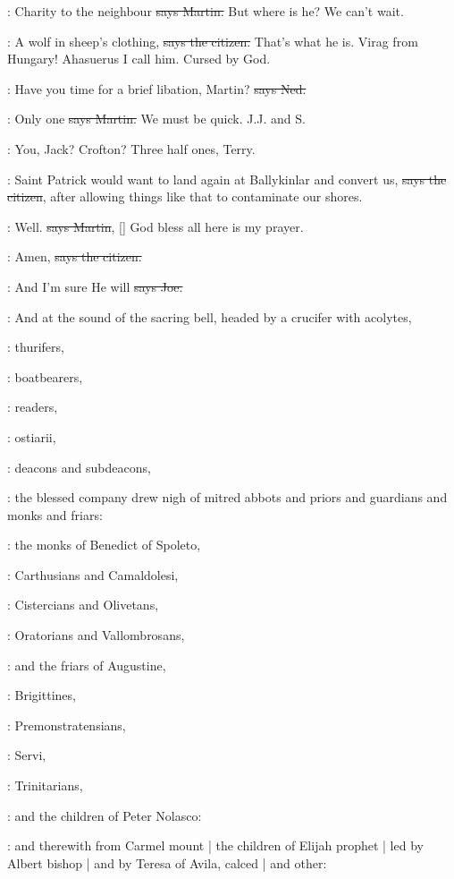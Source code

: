 \cunningham:
Charity to the neighbour
\sout{says Martin.}
But where is he?
We can't wait.

\citizen:
A wolf in sheep's clothing,
\sout{says the citizen.}
That's what he is.
Virag from Hungary!
Ahasuerus I call him.
Cursed by God.

\lambert:
Have you time for a brief libation,
Martin?
\sout{says Ned.}

\cunningham:
Only one
\sout{says Martin.}
We must be quick.
J.J. and S.

\lambert:
You,
Jack?
Crofton?
Three half ones,
Terry.

\citizen:
Saint Patrick would want to land again
at Ballykinlar and convert us,
\sout{says the citizen},
after allowing things like that to contaminate our shores.

\cunningham:
Well.
\sout{says Martin},
[]
God bless all here is my prayer.

\citizen:
Amen,
\sout{says the citizen.}

\joe:
And I'm sure He will
\sout{says Joe.}

:
And at the sound of the sacring bell,
headed by a crucifer with acolytes,

:
thurifers,

:
boatbearers,

:
readers,

:
ostiarii,

:
deacons and subdeacons,

:
the blessed company drew nigh
of mitred abbots
and priors
and guardians
and monks
and friars:

:
the monks of Benedict of Spoleto,

:
Carthusians and Camaldolesi,

:
Cistercians and Olivetans,

:
Oratorians and Vallombrosans,

:
and the friars of Augustine,

:
Brigittines,

:
Premonstratensians,

:
Servi,

:
Trinitarians,

:
and the children of Peter Nolasco:

:
and therewith from Carmel mount |
the children of Elijah prophet |
led by Albert bishop |
and by Teresa of Avila,
calced |
and other:

